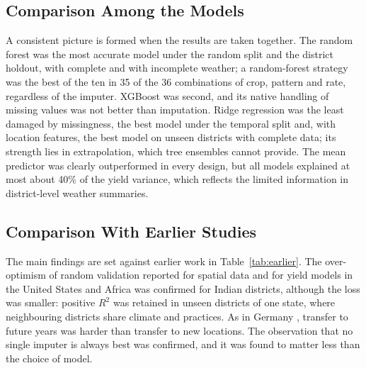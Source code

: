 \subsection{Comparison Among the Models}

A consistent picture is formed when the results are taken together. The random forest was the
most accurate model under the random split and the district holdout, with complete and with
incomplete weather; a random-forest strategy was the best of the ten in 35 of the 36 combinations
of crop, pattern and rate, regardless of the imputer. XGBoost was second, and its
native handling of missing values was not better than imputation. Ridge regression was the least
damaged by missingness, the best model under the temporal split and, with location features, the
best model on unseen districts with complete data; its strength lies in extrapolation, which tree
ensembles cannot provide. The mean predictor was clearly outperformed in every design, but all
models explained at most about 40\% of the yield variance, which reflects the limited information
in district-level weather summaries.

\subsection{Comparison With Earlier Studies}

The main findings are set against earlier work in Table~\ref{tab:earlier}. The over-optimism of
random validation reported for spatial data \cite{roberts2017,ploton2020} and for yield models in
the United States and Africa \cite{chakravarty2026,adjei2026} was confirmed for Indian districts,
although the loss was smaller: positive $R^2$ was retained in unseen districts of one state, where
neighbouring districts share climate and practices. As in Germany \cite{baatz2025}, transfer to
future years was harder than transfer to new locations. The observation that no single imputer is
always best \cite{saini2024,calin2023} was confirmed, and it was found to matter less than the
choice of model.

